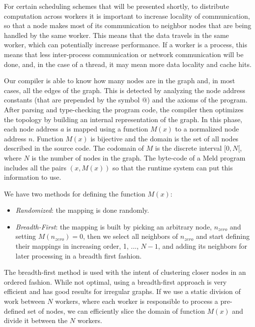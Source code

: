 \documentclass[preprint]{sigplanconf}
\begin{document}
For certain scheduling schemes that will be presented shortly,
to distribute computation across workers it is important
to increase locality of communication, so that a node makes most of its communication to
neighbor nodes that are being handled by the same worker. This means that the data travels
in the same worker, which can potentially increase performance. If a worker is a process,
this means that less inter-process communication or network communication will be done, and,
in the case of a thread, it may mean more data locality and cache hits.

Our compiler is able to know how many nodes are in the graph and, in most cases, all the
edges of the graph. This is detected by analyzing the node address constants (that are prepended
by the symbol @) and the axioms of the program. After parsing and type-checking the program code,
the compiler then optimizes the topology by building an internal representation of the graph.
In this phase, each node address $a$ is mapped using a function $M(x)$ to a normalized node
address $n$. Function $M(x)$ is bijective and the domain is the set of all nodes described in the
source code. The codomain of $M$ is the discrete interval $[0, N[$, where $N$ is the number
of nodes in the graph. The byte-code of a Meld program includes all the pairs $(x, M(x))$ so
that the runtime system can put this information to use.

We have two methods for defining the function $M(x)$:

\begin{itemize}
   \item \emph{Randomized}: the mapping is done randomly.
   \item \emph{Breadth-First}: the mapping is built by picking an arbitrary node, $n_{zero}$
   and setting $M(n_{zero}) = 0$, then we select all neighbors of $n_{zero}$ and start defining
   their mappings in increasing order, 1, ..., $N-1$, and adding its neighbors for later processing
   in a breadth first fashion.
\end{itemize}

The breadth-first method is used with the intent of clustering closer nodes in an ordered fashion.
While not optimal, using a breadth-first approach is very efficient and has good results for
irregular graphs. If we use a static division of work between $N$ workers, where each worker
is responsible to process a pre-defined set of nodes, we can efficiently slice the domain of function
$M(x)$ and divide it between the $N$ workers.
\end{document}

